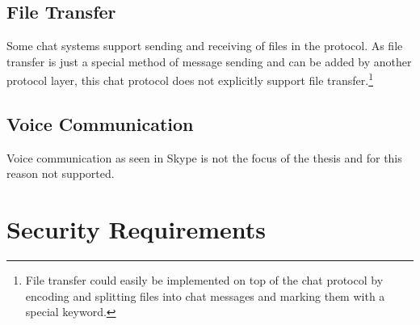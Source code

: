 \subsection{File Transfer}
Some chat systems support sending and receiving of files in the protocol.
As file transfer is just a special method of message sending and can be
added by another protocol layer, this chat protocol does not explicitly
support file transfer.\footnote{File transfer could easily be implemented
on top of the chat protocol by encoding and splitting
files into chat messages and marking them with a special keyword.}
\subsection{Voice Communication}
Voice communication as seen in Skype is not the focus of the thesis and for
this reason not supported.
\section{Security Requirements}
